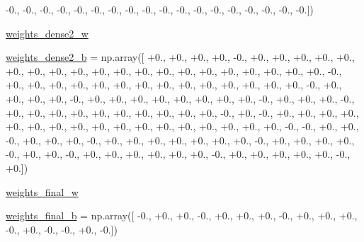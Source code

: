\begin{DoxyCompactItemize}
-\/0., -\/0., -\/0., -\/0., -\/0., -\/0., -\/0., -\/0., -\/0., -\/0., -\/0., -\/0., -\/0., -\/0., -\/0., -\/0., -\/0., -\/0.\mbox{]})
\item 
\hyperlink{namespacepybullet-gym_1_1pybulletgym_1_1examples_1_1roboschool-weights_1_1enjoy___t_f___humanoid6cf5bb1cece630011749e55e6e33a106_ad673fd55ed5567afa3e693186e6f302d}{weights\+\_\+dense2\+\_\+w}
\item 
\hyperlink{namespacepybullet-gym_1_1pybulletgym_1_1examples_1_1roboschool-weights_1_1enjoy___t_f___humanoid6cf5bb1cece630011749e55e6e33a106_a51eabf3fc1da5b82964ff0424ad584af}{weights\+\_\+dense2\+\_\+b} = np.\+array(\mbox{[} +0., +0., +0., +0., -\/0., +0., +0., +0., +0., +0., +0., +0., +0., +0., +0., +0., +0., +0., +0., +0., +0., +0., +0., +0., +0., -\/0., +0., +0., +0., +0., +0., +0., +0., +0., +0., +0., +0., +0., +0., +0., -\/0., +0., +0., +0., +0., -\/0., +0., +0., +0., +0., +0., +0., +0., +0., -\/0., +0., +0., +0., -\/0., +0., +0., +0., +0., +0., +0., +0., +0., +0., +0., -\/0., +0., -\/0., +0., +0., +0., +0., +0., +0., +0., +0., +0., +0., +0., +0., +0., +0., +0., +0., +0., -\/0., -\/0., +0., +0., -\/0., +0., +0., +0., -\/0., +0., +0., +0., +0., +0., +0., +0., -\/0., +0., +0., +0., +0., -\/0., +0., +0., -\/0., +0., +0., +0., +0., +0., +0., -\/0., +0., +0., +0., +0., +0., -\/0., +0.\mbox{]})
\item 
\hyperlink{namespacepybullet-gym_1_1pybulletgym_1_1examples_1_1roboschool-weights_1_1enjoy___t_f___humanoid6cf5bb1cece630011749e55e6e33a106_afe8f0716afae9eed60580b26de3535f5}{weights\+\_\+final\+\_\+w}
\item 
\hyperlink{namespacepybullet-gym_1_1pybulletgym_1_1examples_1_1roboschool-weights_1_1enjoy___t_f___humanoid6cf5bb1cece630011749e55e6e33a106_af4268cca2688f7f607d4e5c9b05c42b6}{weights\+\_\+final\+\_\+b} = np.\+array(\mbox{[} -\/0., +0., +0., -\/0., +0., +0., +0., -\/0., +0., +0., +0., -\/0., +0., -\/0., -\/0., +0., -\/0.\mbox{]})
\end{DoxyCompactItemize}


